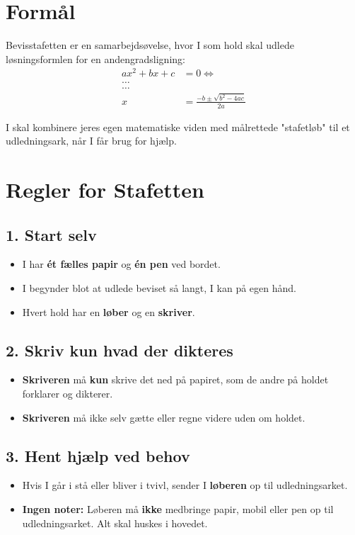 \documentclass[a4paper, 11pt]{article}
\date{}
\title{}
\begin{document}
\section*{Formål}
\label{sec:org13f370d}
Bevisstafetten er en samarbejdsøvelse, hvor I som hold skal udlede løsningsformlen for en andengradsligning:
\begin{align*}
ax^2 + bx + c &= 0 \iff \\
\dots \\
\dots \\
x &= \frac{-b \pm \sqrt{b^2-4ac}}{2a}
\end{align*}

I skal kombinere jeres egen matematiske viden med målrettede "stafetløb" til et udledningsark, når I får brug for hjælp.
\section*{Regler for Stafetten}
\label{sec:org4cae23c}

\subsection*{1. Start selv}
\label{sec:org49335bf}
\begin{itemize}
\item I har \textbf{ét fælles papir} og \textbf{én pen} ved bordet.
\item I begynder blot at udlede beviset så langt, I kan på egen hånd.
\item Hvert hold har en \textbf{løber} og en \textbf{skriver}.
\end{itemize}
\subsection*{2. Skriv kun hvad der dikteres}
\label{sec:org8bb31c5}
\begin{itemize}
\item \textbf{Skriveren} må \textbf{kun} skrive det ned på papiret, som de andre på holdet forklarer og dikterer.
\item \textbf{Skriveren} må ikke selv gætte eller regne videre uden om holdet.
\end{itemize}
\subsection*{3. Hent hjælp ved behov}
\label{sec:org973aafa}
\begin{itemize}
\item Hvis I går i stå eller bliver i tvivl, sender I \textbf{løberen} op til udledningsarket.
\item \textbf{Ingen noter:} Løberen må \textbf{ikke} medbringe papir, mobil eller pen op til udledningsarket. Alt skal huskes i hovedet.
\end{itemize}
\end{document}
